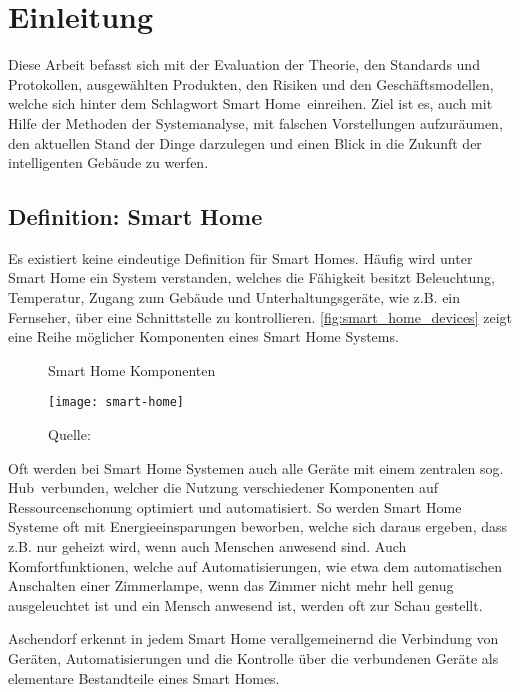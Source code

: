 \section{Einleitung}

Diese Arbeit befasst sich mit der Evaluation der Theorie, den Standards und Protokollen, ausgewählten Produkten, den Risiken und den Geschäftsmodellen, welche sich hinter dem Schlagwort \glqq Smart Home\grqq \ einreihen.
Ziel ist es, auch mit Hilfe der Methoden der Systemanalyse, mit falschen Vorstellungen aufzuräumen, den aktuellen Stand der Dinge darzulegen und einen Blick in die Zukunft der intelligenten Gebäude zu werfen.

\subsection{Definition: Smart Home}

Es existiert keine eindeutige Definition für Smart Homes.
Häufig wird unter Smart Home ein System verstanden, welches die Fähigkeit besitzt Beleuchtung, Temperatur, Zugang zum Gebäude und Unterhaltungsgeräte, wie z.B. ein Fernseher, über eine Schnittstelle zu kontrollieren.
\autoref{fig:smart_home_devices} zeigt eine Reihe möglicher Komponenten eines Smart Home Systems.

\begin{wrapfigure}{r}{0.5\textwidth}
	\centering
	\caption{Smart Home Komponenten}
	\texttt{[image: smart-home]}
	\caption*{\footnotesize{Quelle: }}
	\label{fig:smart_home_devices}
\end{wrapfigure}

Oft werden bei Smart Home Systemen auch alle Geräte mit einem zentralen sog. \glqq Hub\grqq \ verbunden, welcher die Nutzung verschiedener Komponenten auf Ressourcenschonung optimiert und automatisiert.
So werden Smart Home Systeme oft mit Energieeinsparungen beworben, welche sich daraus ergeben, dass z.B. nur geheizt wird, wenn auch Menschen anwesend sind.
Auch Komfortfunktionen, welche auf Automatisierungen, wie etwa dem automatischen Anschalten einer Zimmerlampe, wenn das Zimmer nicht mehr hell genug ausgeleuchtet ist und ein Mensch anwesend ist, werden oft zur Schau gestellt.

Aschendorf erkennt in jedem Smart Home verallgemeinernd die Verbindung von Geräten, Automatisierungen und die Kontrolle über die verbundenen Geräte als elementare Bestandteile eines Smart Homes.

